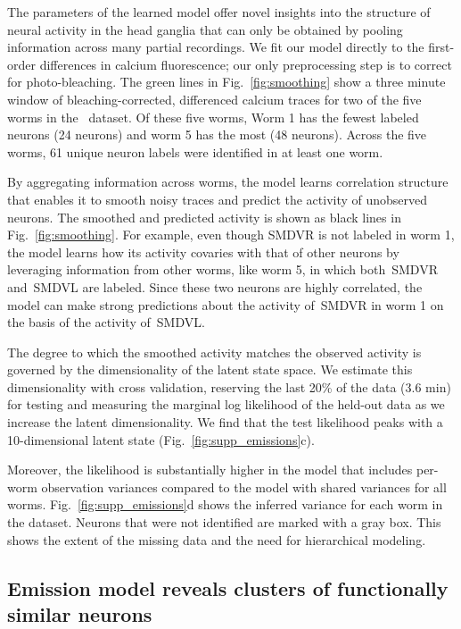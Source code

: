 \documentclass[11pt]{article}
\begin{document}
The parameters of the learned model offer novel insights into the
structure of neural activity in the head ganglia that can only be
obtained by pooling information across many partial recordings.  We
fit our model directly to the first-order differences in calcium
fluorescence; our only preprocessing step is to correct for
photo-bleaching. The green lines in Fig.~\ref{fig:smoothing} show a
three minute window of bleaching-corrected, differenced calcium traces
for two of the five worms in the~\citet{kato2015global} dataset. Of
these five worms, Worm 1 has the fewest labeled neurons (24 neurons)
and worm 5 has the most (48 neurons). Across the five worms, 61 unique
neuron labels were identified in at least one worm.

By aggregating information across worms, the model learns correlation
structure that enables it to smooth noisy traces and predict the
activity of unobserved neurons.  The smoothed and predicted activity
is shown as black lines in Fig.~\ref{fig:smoothing}. For example,
even though \textsf{SMDVR} is not labeled in worm 1, the model
learns how its activity covaries with that of other neurons
by leveraging information from other worms, like worm 5, in which
both~\textsf{SMDVR} and~\textsf{SMDVL} are labeled.  Since these
two neurons are highly correlated, the model can make strong predictions
about the activity of~\textsf{SMDVR} in worm 1 on the basis of the
activity of~\textsf{SMDVL}.

The degree to which the smoothed activity matches the observed
activity is governed by the dimensionality of the latent state space.
We estimate this dimensionality with cross validation, reserving the
last 20\% of the data (3.6 min) for testing and measuring the marginal
log likelihood of the held-out data as we increase the latent
dimensionality. We find that the test likelihood peaks with a
10-dimensional latent state (Fig.~\ref{fig:supp_emissions}c).

Moreover, the likelihood is substantially higher in the model that
includes per-worm observation variances compared to the model with
shared variances for all worms. Fig.~\ref{fig:supp_emissions}d shows
the inferred variance for each worm in the \citet{kato2015global}
dataset.  Neurons that were not identified are marked with a gray box.
This shows the extent of the missing data and the need for
hierarchical modeling.
 
\subsection*{Emission model reveals clusters of functionally similar neurons}
\end{document}
